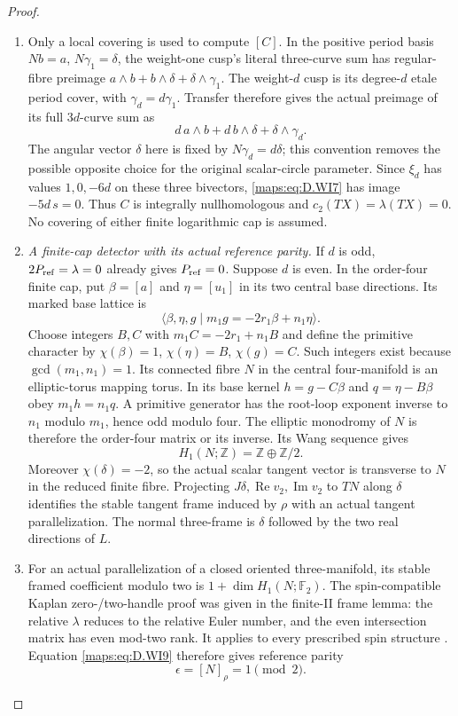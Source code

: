 \begin{proof}
\begin{enumerate}[label=\arabic*.,leftmargin=*]
\item Only a local covering is used to compute $[C]$.
In the positive period basis
$N b=a$, $N\gamma_1=\delta$, the weight-one cusp's literal
three-curve sum has regular-fibre preimage
$a\wedge b+b\wedge\delta+\delta\wedge\gamma_1$.
The weight-$d$ cusp is its degree-$d$ etale period cover, with
$\gamma_d=d\gamma_1$.  Transfer therefore gives the actual
preimage of its full $3d$-curve sum as
\[
 d\,a\wedge b+d\,b\wedge\delta+\delta\wedge\gamma_d.
 \tag{D.WI7}\label{maps:eq:D.WI7}
\]
The angular vector $\delta$ here is fixed by
$N\gamma_d=d\delta$; this convention removes the possible
opposite choice for the original scalar-circle parameter.
Since $\xi_d$ has values $1,0,-6d$ on these three bivectors,
\eqref{maps:eq:D.WI7} has image $-5d\,s=0$.  Thus $C$ is integrally
nullhomologous and $c_2(TX)=\lambda(TX)=0$.
No covering of either finite logarithmic cap is assumed.

\item \emph{A finite-cap detector with its actual reference parity.}
If $d$ is odd, $2P_{\rm ref}=\lambda=0$ already gives
$P_{\rm ref}=0$.  Suppose $d$ is even.  In the order-four
finite cap, put $\beta=[a]$ and $\eta=[u_1]$ in its two
central base directions.  Its marked base lattice is
\[
 \langle\beta,\eta,g\mid m_1g=-2r_1\beta+n_1\eta\rangle .
 \tag{D.WI8}\label{maps:eq:D.WI8}
\]
Choose integers $B,C$ with $m_1C=-2r_1+n_1B$ and define the
primitive character by $\chi(\beta)=1$, $\chi(\eta)=B$,
$\chi(g)=C$.  Such integers exist because $\gcd(m_1,n_1)=1$.
Its connected fibre $N$ in the central four-manifold is an
elliptic-torus mapping torus.  In its base kernel
$h=g-C\beta$ and $q=\eta-B\beta$ obey $m_1h=n_1q$.
A primitive generator has the root-loop exponent inverse to
$n_1$ modulo $m_1$, hence odd modulo four.  The elliptic
monodromy of $N$ is therefore the order-four matrix or its
inverse.  Its Wang sequence gives
\[
             H_1(N;\mathbb Z)=\mathbb Z\oplus\mathbb Z/2.
 \tag{D.WI9}\label{maps:eq:D.WI9}
\]
Moreover $\chi(\delta)=-2$, so the actual scalar tangent
vector is transverse to $N$ in the reduced finite fibre.
Projecting $J\delta,\operatorname{Re}v_2,\operatorname{Im}v_2$
to $TN$ along $\delta$ identifies the stable tangent frame
induced by $\rho$ with an actual tangent parallelization.
The normal three-frame is $\delta$ followed by the two real
directions of $L$.

\item For an actual parallelization of a closed oriented
three-manifold, its stable framed coefficient modulo two is
$1+\dim H_1(N;\mathbb F_2)$.  The spin-compatible Kaplan
zero-/two-handle proof was given in the finite-II frame lemma:
the relative $\lambda$ reduces to the relative Euler number,
and the even intersection matrix has even mod-two rank.
It applies to every prescribed spin structure
\cite[Definition 1.7 and Theorem 3.1, pp.239,243--246]{mapsKaplan79}.
Equation \eqref{maps:eq:D.WI9} therefore gives reference parity
\[
                         \epsilon=[N]_\rho=1\pmod2 .
 \tag{D.WI10}\label{maps:eq:D.WI10}
\]


\end{enumerate}
\end{proof}
